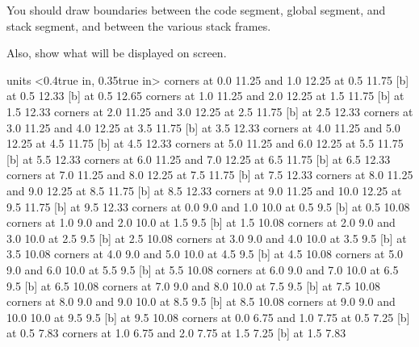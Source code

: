 You should draw boundaries between the code segment, global
segment, and stack segment, and between the various stack frames.
\medskip

Also, show what will be displayed on screen.

\vfil\eject

\vbox{
\beginpicture
\setcoordinatesystem units <0.4true in, 0.35true in>
\putrectangle corners at 0.0 11.25 and 1.0 12.25
 at 0.5 11.75
 [b] at 0.5 12.33
 [b] at 0.5 12.65
\putrectangle corners at 1.0 11.25 and 2.0 12.25
 at 1.5 11.75
 [b] at 1.5 12.33
\putrectangle corners at 2.0 11.25 and 3.0 12.25
 at 2.5 11.75
 [b] at 2.5 12.33
\putrectangle corners at 3.0 11.25 and 4.0 12.25
 at 3.5 11.75
 [b] at 3.5 12.33
\putrectangle corners at 4.0 11.25 and 5.0 12.25
 at 4.5 11.75
 [b] at 4.5 12.33
\putrectangle corners at 5.0 11.25 and 6.0 12.25
 at 5.5 11.75
 [b] at 5.5 12.33
\putrectangle corners at 6.0 11.25 and 7.0 12.25
 at 6.5 11.75
 [b] at 6.5 12.33
\putrectangle corners at 7.0 11.25 and 8.0 12.25
 at 7.5 11.75
 [b] at 7.5 12.33
\putrectangle corners at 8.0 11.25 and 9.0 12.25
 at 8.5 11.75
 [b] at 8.5 12.33
\putrectangle corners at 9.0 11.25 and 10.0 12.25
 at 9.5 11.75
 [b] at 9.5 12.33
\putrectangle corners at 0.0 9.0 and 1.0 10.0
 at 0.5 9.5
 [b] at 0.5 10.08
\putrectangle corners at 1.0 9.0 and 2.0 10.0
 at 1.5 9.5
 [b] at 1.5 10.08
\putrectangle corners at 2.0 9.0 and 3.0 10.0
 at 2.5 9.5
 [b] at 2.5 10.08
\putrectangle corners at 3.0 9.0 and 4.0 10.0
 at 3.5 9.5
 [b] at 3.5 10.08
\putrectangle corners at 4.0 9.0 and 5.0 10.0
 at 4.5 9.5
 [b] at 4.5 10.08
\putrectangle corners at 5.0 9.0 and 6.0 10.0
 at 5.5 9.5
 [b] at 5.5 10.08
\putrectangle corners at 6.0 9.0 and 7.0 10.0
 at 6.5 9.5
 [b] at 6.5 10.08
\putrectangle corners at 7.0 9.0 and 8.0 10.0
 at 7.5 9.5
 [b] at 7.5 10.08
\putrectangle corners at 8.0 9.0 and 9.0 10.0
 at 8.5 9.5
 [b] at 8.5 10.08
\putrectangle corners at 9.0 9.0 and 10.0 10.0
 at 9.5 9.5
 [b] at 9.5 10.08
\putrectangle corners at 0.0 6.75 and 1.0 7.75
 at 0.5 7.25
 [b] at 0.5 7.83
\putrectangle corners at 1.0 6.75 and 2.0 7.75
 at 1.5 7.25
 [b] at 1.5 7.83
}
